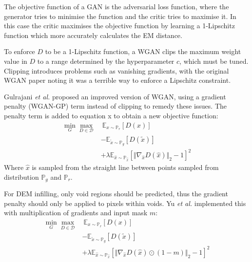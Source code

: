 \documentclass[twocolumn]{article}
\begin{document}
The objective function of a GAN is the adversarial loss function, where the generator tries to minimise the function and the critic tries to maximise it.
In this case the critic maximises the objective function by learning a 1-Lipschitz function which more accurately calculates the EM distance.

To enforce \(D\) to be a 1-Lipschitz function, a WGAN clips the maximum weight value in \(D\) to a range determined by the hyperparameter \(c\), which must be tuned.
Clipping introduces problems such as vanishing gradients, with the original WGAN paper noting it was a terrible way to enforce a Lipschitz constraint\autocite{arjovskyWassersteinGenerativeAdversarial2017}.

Gulrajani \emph{et al.}\autocite{gulrajaniImprovedTrainingWasserstein2017} proposed an improved version of WGAN, using a gradient penalty (WGAN-GP) term instead of clipping to remedy these issues.
The penalty term is added to equation x to obtain a new objective function:
\begin{equation}
\begin{split}
 \min_G \max_{D \in \mathcal{D}} &\  \mathbb{E}_{x \sim \mathbb{P}_r} \left[D(x)\right] \\  &- \mathbb{E}_{\tilde{x} \sim \mathbb{P}_g} \left[ D(\tilde{x}) \right] \\ &+ \lambda \mathbb{E}_{\hat{x} \sim \mathbb{P}_{\hat{x}}} \left[ \Vert \nabla_{\hat{x}}D(\hat{x}) \Vert_2 - 1 \right]^2
\end{split}
\end{equation}
Where \(\hat{x}\) is sampled from the straight line between points sampled from distribution \(\mathbb{P}_g\) and \(\mathbb{P}_r\).

For DEM infilling, only void regions should be predicted, thus the gradient penalty should only be applied to pixels within voids.
Yu \emph{et al.}\autocite{yuGenerativeImageInpainting2018} implemented this with multiplication of gradients and input mask \(m\):
\begin{equation}
\begin{split}
 \min_G \max_{D \in \mathcal{D}} &\ \mathbb{E}_{x \sim \mathbb{P}_r} \left[D(x)\right] \\ &- \mathbb{E}_{\tilde{x} \sim \mathbb{P}_g} \left[ D(\tilde{x}) \right] \\ &+ \lambda \mathbb{E}_{\hat{x} \sim \mathbb{P}_{\hat{x}}} \left[ \Vert \nabla_{\hat{x}}D(\hat{x}) \odot (1 - m) \Vert_2 - 1 \right]^2
\end{split}
\end{equation}
\end{document}
